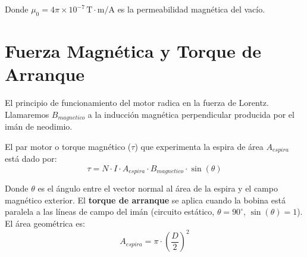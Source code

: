 \documentclass[conference, a4paper]{IEEEtran}
\begin{document}
Donde $\mu_0 = 4\pi \times 10^{-7} \, \text{T}\cdot\text{m/A}$ es la permeabilidad magnética del vacío. 


\section{Fuerza Magnética y Torque de Arranque}
El principio de funcionamiento del motor radica en la fuerza de Lorentz. Llamaremos $B_{magnetico}$ a la inducción magnética perpendicular producida por el imán de neodimio. 

El par motor o torque magnético ($\tau$) que experimenta la espira de área $A_{espira}$ está dado por:
\begin{equation}
    \tau = N \cdot I \cdot A_{espira} \cdot B_{magnetico} \cdot \sin(\theta)
\end{equation}

Donde $\theta$ es el ángulo entre el vector normal al área de la espira y el campo magnético exterior. El \textbf{torque de arranque} se aplica cuando la bobina está paralela a las líneas de campo del imán (circuito estático, $\theta = 90^\circ$, $\sin(\theta) = 1$). El área geométrica es:
\begin{equation*}
    A_{espira} = \pi \cdot \left(\frac{D}{2}\right)^2 
\end{equation*}
\end{document}
